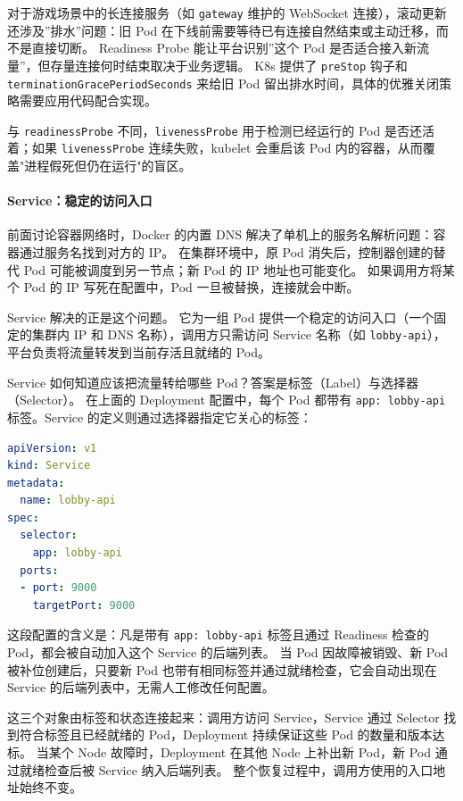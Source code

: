 对于游戏场景中的长连接服务（如 \texttt{gateway} 维护的 WebSocket 连接），滚动更新还涉及”排水”问题：旧 Pod 在下线前需要等待已有连接自然结束或主动迁移，而不是直接切断。
Readiness Probe 能让平台识别”这个 Pod 是否适合接入新流量”，但存量连接何时结束取决于业务逻辑。
K8s 提供了 \texttt{preStop} 钩子和 \texttt{terminationGracePeriodSeconds} 来给旧 Pod 留出排水时间，具体的优雅关闭策略需要应用代码配合实现。

与 \texttt{readinessProbe} 不同，\texttt{livenessProbe} 用于检测已经运行的 Pod 是否还活着；如果 \texttt{livenessProbe} 连续失败，kubelet 会重启该 Pod 内的容器，从而覆盖"进程假死但仍在运行"的盲区。

\paragraph{Service：稳定的访问入口}

前面讨论容器网络时，Docker 的内置 DNS 解决了单机上的服务名解析问题：容器通过服务名找到对方的 IP。
在集群环境中，原 Pod 消失后，控制器创建的替代 Pod 可能被调度到另一节点；新 Pod 的 IP 地址也可能变化。
如果调用方将某个 Pod 的 IP 写死在配置中，Pod 一旦被替换，连接就会中断。

Service 解决的正是这个问题。
它为一组 Pod 提供一个稳定的访问入口（一个固定的集群内 IP 和 DNS 名称），调用方只需访问 Service 名称（如 \texttt{lobby-api}），平台负责将流量转发到当前存活且就绪的 Pod。

Service 如何知道应该把流量转给哪些 Pod？答案是标签（Label）与选择器（Selector）。
在上面的 Deployment 配置中，每个 Pod 都带有 \texttt{app: lobby-api} 标签。Service 的定义则通过选择器指定它关心的标签：

\begin{tcolorbox}[title=大厅服 Service 配置示例]
\begin{lstlisting}[style=codeblock, language=yaml]
apiVersion: v1
kind: Service
metadata:
  name: lobby-api
spec:
  selector:
    app: lobby-api
  ports:
  - port: 9000
    targetPort: 9000
\end{lstlisting}
\end{tcolorbox}

这段配置的含义是：凡是带有 \texttt{app: lobby-api} 标签且通过 Readiness 检查的 Pod，都会被自动加入这个 Service 的后端列表。
当 Pod 因故障被销毁、新 Pod 被补位创建后，只要新 Pod 也带有相同标签并通过就绪检查，它会自动出现在 Service 的后端列表中，无需人工修改任何配置。

这三个对象由标签和状态连接起来：调用方访问 Service，Service 通过 Selector 找到符合标签且已经就绪的 Pod，Deployment 持续保证这些 Pod 的数量和版本达标。
当某个 Node 故障时，Deployment 在其他 Node 上补出新 Pod，新 Pod 通过就绪检查后被 Service 纳入后端列表。
整个恢复过程中，调用方使用的入口地址始终不变。

